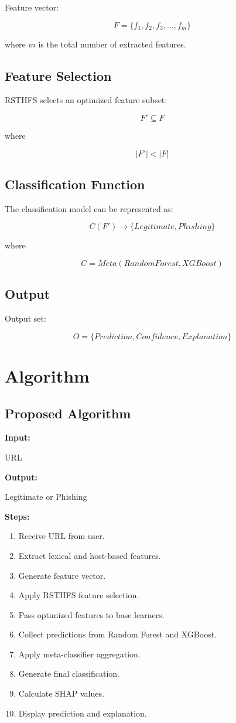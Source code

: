 \documentclass[12pt]{report}
\begin{document}
Feature vector:

\[
F = \{f_1,f_2,f_3,\ldots,f_m\}
\]

where \(m\) is the total number of extracted features.

\subsection{Feature Selection}

RSTHFS selects an optimized feature subset:

\[
F' \subseteq F
\]

where

\[
|F'| < |F|
\]

\subsection{Classification Function}

The classification model can be represented as:

\[
C(F') \rightarrow \{Legitimate, Phishing\}
\]

where

\[
C = Meta(RandomForest, XGBoost)
\]

\subsection{Output}

Output set:

\[
O = \{Prediction, Confidence, Explanation\}
\]

\section{Algorithm}

\subsection{Proposed Algorithm}

\textbf{Input:}

URL

\textbf{Output:}

Legitimate or Phishing

\textbf{Steps:}

\begin{enumerate}
    \item Receive URL from user.
    \item Extract lexical and host-based features.
    \item Generate feature vector.
    \item Apply RSTHFS feature selection.
    \item Pass optimized features to base learners.
    \item Collect predictions from Random Forest and XGBoost.
    \item Apply meta-classifier aggregation.
    \item Generate final classification.
    \item Calculate SHAP values.
    \item Display prediction and explanation.
\end{enumerate}
\end{document}
